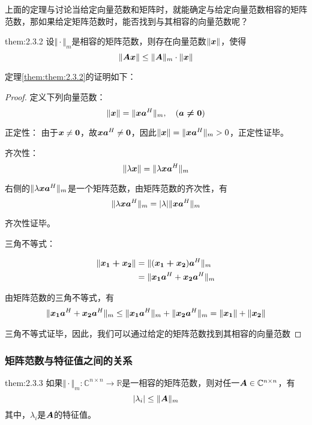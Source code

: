 \documentclass[12pt, a4paper, oneside, UTF8]{ctexbook}
\begin{document}
上面的定理与讨论当给定向量范数和矩阵时，就能确定与给定向量范数相容的矩阵范数，那如果给定矩阵范数时，能否找到与其相容的向量范数呢？

\begin{them}{}{them:2.3.2}
    设$\Vert\cdot\Vert_m$是相容的矩阵范数，则存在向量范数$\Vert\boldsymbol{x}\Vert$，使得\[\Vert\boldsymbol{Ax}\Vert\leq\Vert\boldsymbol{A}\Vert_m\cdot\Vert\boldsymbol{x}\Vert\]
\end{them}

定理\ref{them:them:2.3.2}的证明如下：

\begin{proof}
定义下列向量范数：\[\Vert\bs{x}\Vert=\Vert\bs{xa}^H\Vert_m,\ \ \ (\bs{a\neq\bs{0}})\]

正定性：
由于$\boldsymbol{x}\neq \boldsymbol{0}$，故$\boldsymbol{xa}^H\neq\boldsymbol{0}$，因此$\Vert\boldsymbol{x}\Vert=\Vert\boldsymbol{xa}^H\Vert_m>0$，正定性证毕。


齐次性：
\[\Vert\lambda\boldsymbol{x}\Vert=\Vert\lambda\boldsymbol{xa}^H\Vert_m\]

右侧的$\Vert\lambda\boldsymbol{xa}^H\Vert_m$是一个矩阵范数，由矩阵范数的齐次性，有\[\Vert\lambda\boldsymbol{xa}^H\Vert_m=|\lambda|\Vert\boldsymbol{xa}^H\Vert_m\]

齐次性证毕。

三角不等式：

\[\begin{aligned}
    \Vert\boldsymbol{x_1+x_2}\Vert&=\Vert(\boldsymbol{x_1+x_2})\boldsymbol{a}^H\Vert_m\\
    &=\Vert\boldsymbol{x_1a}^H+\boldsymbol{x_2a}^H\Vert_m
\end{aligned}\]

由矩阵范数的三角不等式，有
\[\begin{aligned}
    \Vert\boldsymbol{x_1a}^H+\boldsymbol{x_2a}^H\Vert_m\leq\Vert\boldsymbol{x_1a}^H\Vert_m+\Vert\boldsymbol{x_2a}^H\Vert_m=\Vert\boldsymbol{x_1}\Vert+\Vert\boldsymbol{x_2}\Vert
\end{aligned}\]

三角不等式证毕，因此，我们可以通过给定的矩阵范数找到其相容的向量范数
\end{proof}

\subsubsection{矩阵范数与特征值之间的关系}
\begin{them}{}{them:2.3.3}
    如果$\Vert\cdot\Vert_m: \mathbb{C}^{n\times n}\rightarrow \mathbb{R} $是一相容的矩阵范数，则对任一$\boldsymbol{A}\in\mathbb{C}^{n\times n}$，有\[|\lambda_i|\leq \Vert\boldsymbol{A}\Vert_m\]其中，$\lambda_i$是$\boldsymbol{A}$的特征值。
\end{them}
\end{document}
